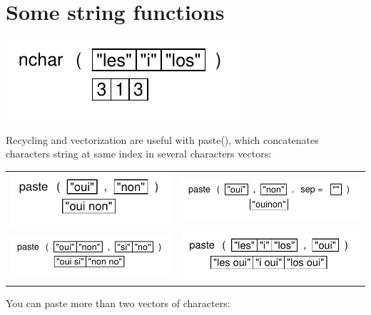 \documentclass[pdflatex]{article}
\begin{document}
\section{Some string functions}

\includegraphics{nchar}

Recycling and vectorization are useful with paste(), which concatenates characters string at same index in several characters vectors:

\begin{tabular}{cc}
\includegraphics{paste} & \includegraphics{paste2}\\
\includegraphics{paste3} & \includegraphics{paste4}\\
\end{tabular}

You can paste more than two vectors of characters:
\end{document}

